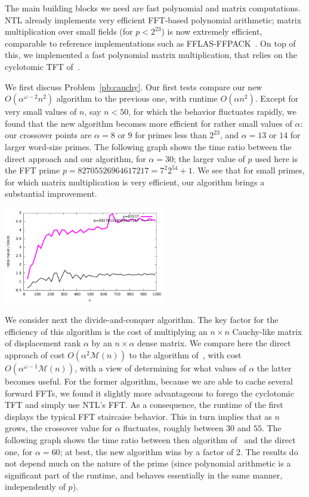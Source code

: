 \documentclass{sig-alternate}
\newcommand{\M}{\ensuremath{\mathscr{M}}}
\begin{document}
The main building blocks we need are fast polynomial and matrix
computations. NTL already implements very efficient FFT-based
polynomial arithmetic; matrix multiplication over small fields (for $p
< 2^{23}$) is now extremely efficient, comparable to reference
implementations such as FFLAS-FFPACK~\cite{fflas-ffpack}. On top of
this, we implemented a fast polynomial matrix multiplication, that
relies on the cyclotomic TFT of~\cite{ArSc15}.

We first discuss Problem~\ref{pb:cauchy}. Our first tests compare our
new $O(\alpha^{\omega-2} n^2)$ algorithm to the previous one, with
runtime $O(\alpha n^2)$. Except for very small values of $n$, say $n <
50$, for which the behavior fluctuates rapidly, we found that the new
algorithm becomes more efficient for rather small values of $\alpha$:
our crossover points are $\alpha=8$ or $9$ for primes less than
$2^{23}$, and $\alpha=13$ or $14$ for larger word-size primes. The
following graph shows the time ratio between the direct approach and
our algorithm, for $\alpha=30$; the larger value of $p$ used here is
the FFT prime $p=82705526964617217=7^2 2^{54}+1$. We see that for
small primes, for which matrix multiplication is very efficient, our
algorithm brings a substantial improvement.

\includegraphics[width=7cm]{ratio-block-eschost-desktop.pdf}

We consider next the divide-and-conquer algorithm. The key factor for
the efficiency of this algorithm is the cost of multiplying an $n
\times n$ Cauchy-like matrix of displacement rank $\alpha$ by an $n
\times \alpha$ dense matrix. We compare here the direct approach of
cost $O(\alpha^2 \M(n))$ to the algorithm of~\cite{BoJeMoSc16}, with
cost $O(\alpha^{\omega-1} \M(n))$, with a view of determining for what
values of $\alpha$ the latter becomes useful. For the former
algorithm, because we are able to cache several forward FFTs, we found
it slightly more advantageous to forego the cyclotomic TFT and simply
use NTL's FFT. As a consequence, the runtime of the first displays the
typical FFT staircaise behavior. This in turn implies that as $n$
grows, the crossover value for $\alpha$ fluctuates, roughly between
$30$ and $55$. The following graph shows the time ratio between then algorithm
of~\cite{BoJeMoSc16} and the direct one, for $\alpha=60$; at
best, the new algorithm wins by a factor of 2. The results do not
depend much on the nature of the prime (since polynomial arithmetic is
a significant part of the runtime, and behaves essentially in the same
manner, independently of $p$).
\end{document}
